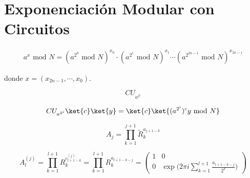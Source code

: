 \chapter{Exponenciación Modular con Circuitos}

\begin{equation}
\begin{split}
a^x \text{ mod }N=(a^{2^0} \text{ mod }N)^{x_0}\cdot (a^{2^1} \text{ mod }N)^{x_1} \cdots (a^{2^{2n-1}} \text{ mod }N)^{x_{2n-1}}
\end{split}
\end{equation}

donde $x=(x_{2n-1},\cdots,x_0)$.

\begin{equation}
CU_{a^{2^i}}
\end{equation}

\begin{equation}
CU_{a^{2^i}}\ket{c}\ket{y}=\ket{c}\ket{(a^{2^i})^cy\text{ mod }N}
\end{equation}

\begin{equation}
A_j=\prod_{k=1}^{j+1}\tilde{R}_k^{a_{j+1-k}}
\end{equation}

\begin{equation}
A_l^{(j)}=\prod_{k=1}^{l+1}R_k^{c_{l+1-k}^{(j)}}=\prod_{k=1}^{l+1}R_k^{a_{l+1-k-j}}=\begin{pmatrix}
1 & 0\\ 0 & \exp\Big(2\pi i\sum_{k=1}^{l+1}\frac{a_{l+1-k-j}}{2^k} \Big)
\end{pmatrix}
\end{equation}